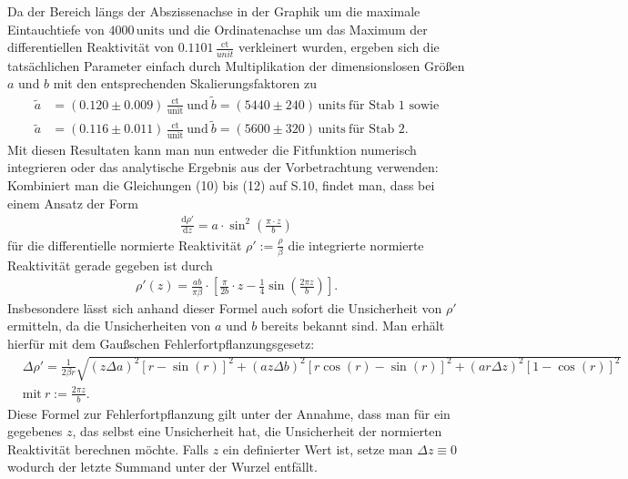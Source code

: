 \documentclass[german,  %
parskip=full,  %
]{scrartcl}
\begin{document}
\newpage
Da der Bereich längs der Abszissenachse in der Graphik um die maximale Eintauchtiefe von \(4000\,\mathrm{units}\) und die Ordinatenachse um das Maximum der differentiellen Reaktivität von \(0.1101\,\frac{\mathrm{ct}}{unit}\) verkleinert wurden, ergeben sich die tatsächlichen Parameter einfach durch Multiplikation der dimensionslosen Größen \(a\) und \(b\) mit den entsprechenden Skalierungsfaktoren zu
\begin{align*}
\tilde{a} &= (0.120\pm 0.009)\,\frac{\mathrm{ct}}{\mathrm{unit}} \ \text{und} \ \tilde{b} = (5440\pm 240)\,\mathrm{units} \ \text{für Stab 1 sowie} \\
\tilde{a} &= (0.116\pm 0.011)\,\frac{\mathrm{ct}}{\mathrm{unit}} \ \text{und} \ \tilde{b} = (5600\pm 320)\,\mathrm{units} \ \text{für Stab 2.} 
\end{align*}
Mit diesen Resultaten kann man nun entweder die Fitfunktion numerisch integrieren oder das analytische Ergebnis aus der Vorbetrachtung verwenden: Kombiniert man die Gleichungen (10) bis (12) auf S.10, findet man, dass bei einem Ansatz der Form
\begin{align*}
\frac{\mathrm{d}\rho'}{\mathrm{d}z} = a\cdot\sin^2\left(\frac{\pi\cdot z}{b}\right)
\end{align*}
für die differentielle normierte Reaktivität \(\rho' := \frac{\rho}{\beta}\) die integrierte normierte Reaktivität gerade gegeben ist durch
\begin{align}
\rho'(z) = \frac{ab}{\pi\beta}\cdot\left[\frac{\pi}{2b}\cdot z - \frac{1}{4}\sin\left(\frac{2\pi z}{b}\right)\right].
\end{align}
Insbesondere lässt sich anhand dieser Formel auch sofort die Unsicherheit von \(\rho'\) ermitteln, da die Unsicherheiten von \(a\) und \(b\) bereits bekannt sind. Man erhält hierfür mit dem Gaußschen Fehlerfortpflanzungsgesetz:
\begin{align}
&\Delta \rho' = \frac{1}{2\beta r}\sqrt{(z \Delta a)^2\left[r - \sin(r)\right]^2 + (a z\Delta b)^2\left[r\cos(r) - \sin(r) \right]^2 + (a r\Delta z)^2\left[1 - \cos(r)\right]^2} \\
&\text{mit} \ r := \frac{2\pi z}{b}.
\end{align}
Diese Formel zur Fehlerfortpflanzung gilt unter der Annahme, dass man für ein gegebenes \(z\), das selbst eine Unsicherheit hat, die Unsicherheit der normierten Reaktivität berechnen möchte. Falls \(z\) ein definierter Wert ist, setze man \(\Delta z \equiv 0\) wodurch der letzte Summand unter der Wurzel entfällt. \\\\
\end{document}

